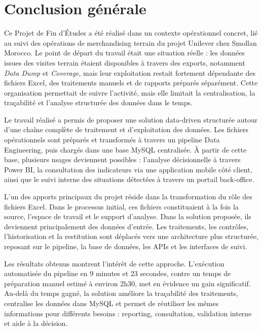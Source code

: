 \chapter*{Conclusion générale}

Ce Projet de Fin d’Études a été réalisé dans un contexte opérationnel concret, lié au suivi des opérations de merchandising terrain du projet Unilever chez Smollan Morocco. Le point de départ du travail était une situation réelle : les données issues des visites terrain étaient disponibles à travers des exports, notamment \textit{Data Dump} et \textit{Coverage}, mais leur exploitation restait fortement dépendante des fichiers Excel, des traitements manuels et de rapports préparés séparément. Cette organisation permettait de suivre l’activité, mais elle limitait la centralisation, la traçabilité et l’analyse structurée des données dans le temps.

Le travail réalisé a permis de proposer une solution data-driven structurée autour d’une chaîne complète de traitement et d’exploitation des données. Les fichiers opérationnels sont préparés et transformés à travers un pipeline Data Engineering, puis chargés dans une base MySQL centralisée. À partir de cette base, plusieurs usages deviennent possibles : l’analyse décisionnelle à travers Power BI, la consultation des indicateurs via une application mobile côté client, ainsi que le suivi interne des situations détectées à travers un portail back-office.

L’un des apports principaux du projet réside dans la transformation du rôle des fichiers Excel. Dans le processus initial, ces fichiers constituaient à la fois la source, l’espace de travail et le support d’analyse. Dans la solution proposée, ils deviennent principalement des données d’entrée. Les traitements, les contrôles, l’historisation et la restitution sont déplacés vers une architecture plus structurée, reposant sur le pipeline, la base de données, les APIs et les interfaces de suivi.

Les résultats obtenus montrent l’intérêt de cette approche. L’exécution automatisée du pipeline en 9 minutes et 23 secondes, contre un temps de préparation manuel estimé à environ 2h30, met en évidence un gain significatif. Au-delà du temps gagné, la solution améliore la traçabilité des traitements, centralise les données dans MySQL et permet de réutiliser les mêmes informations pour différents besoins : reporting, consultation, validation interne et aide à la décision.

